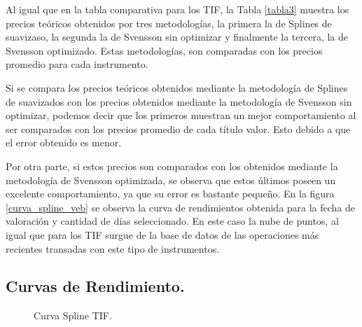 \newpage

\hspace{0.4cm} Al igual que en la tabla comparativa para los TIF, la Tabla \ref{tabla3} muestra los precios te\'oricos obtenidos por tres metodolog\'ias, la primera la de Splines de suavizaso, la segunda la de Svensson sin optimizar y finalmente la tercera, la de Svensson optimizado. Estas metodolog\'ias, son comparadas con los precios promedio para cada instrumento.

\hspace{0.4cm} Si se compara los precios te\'oricos obtenidos mediante la metodolog\'ia de Splines de suavizados con los precios obtenidos mediante la metodolog\'ia de Svensson sin optimizar, podemos decir que los primeros muestran un mejor comportamiento al ser comparados con los precios promedio de cada t\'itulo valor. Esto debido a que el error obtenido es menor.

\hspace{0.4cm}Por otra parte, si estos precios son comparados con los obtenidos mediante la metodolog\'ia de Svensson optimizada, se observa que estos \'ultimos poseen un excelente comportamiento, ya que su error es bastante peque\~no. En la figura \ref{curva_spline_veb} se observa la curva de rendimientos obtenida para la fecha de valoraci\'on y cantidad de d\'ias seleccionado. En este caso la nube de puntos, al igual que para los TIF surgue de la base de datos de las operaciones m\'as recientes transadas con este tipo de instrumentos.

\subsection{Curvas de Rendimiento.} \hspace{5cm}


\begin{figure}[h]
\caption{Curva Spline TIF.}
\label{curva_spline_tif}
\end{figure}


